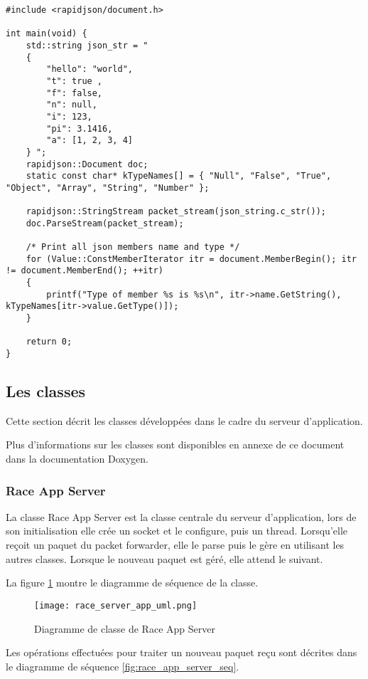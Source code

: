 \begin{lstlisting}[style=CStyle]
#include <rapidjson/document.h>

int main(void) {
	std::string json_str = "
	{
    	"hello": "world",
    	"t": true ,
    	"f": false,
    	"n": null,
    	"i": 123,
    	"pi": 3.1416,
    	"a": [1, 2, 3, 4]
	} ";
	rapidjson::Document doc;
	static const char* kTypeNames[] = { "Null", "False", "True", "Object", "Array", "String", "Number" };
	
	rapidjson::StringStream packet_stream(json_string.c_str());
	doc.ParseStream(packet_stream);
	
	/* Print all json members name and type */
	for (Value::ConstMemberIterator itr = document.MemberBegin(); itr != document.MemberEnd(); ++itr)
	{
    	printf("Type of member %s is %s\n", itr->name.GetString(), kTypeNames[itr->value.GetType()]);
	}

	return 0;
}
\end{lstlisting}

\subsection{Les classes}

Cette section décrit les classes développées dans le cadre du serveur d'application.

Plus d'informations sur les classes sont disponibles en annexe de ce document dans la documentation Doxygen.

\subsubsection{Race App Server}

La classe Race App Server est la classe centrale du serveur d'application, lors de son initialisation elle crée un socket et le configure, puis un thread. Lorsqu'elle reçoit un paquet du packet forwarder, elle le parse puis le gère en utilisant les autres classes. Lorsque le nouveau paquet est géré, elle attend le suivant.

La figure \ref{fig:race_app_server_uml} montre le diagramme de séquence de la classe.

\begin{figure}[htb]
\centering 
\texttt{[image: race\_server\_app\_uml.png]} 
\caption{Diagramme de classe de Race App Server}
\label{fig:race_app_server_uml}
\end{figure}

Les opérations effectuées pour traiter un nouveau paquet reçu sont décrites dans le diagramme de séquence \ref{fig:race_app_server_seq}.

